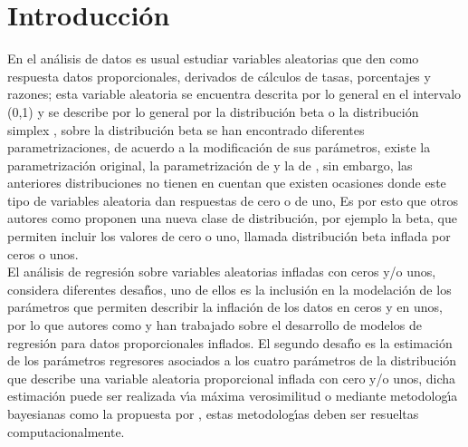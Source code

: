 \chapter{Introducci\'{o}n}


En el an\'{a}lisis de datos es usual estudiar variables aleatorias que den como respuesta datos proporcionales, derivados de c\'{a}lculos de tasas, porcentajes y razones; esta variable aleatoria se encuentra descrita por lo general en el intervalo (0,1) y se describe por lo general por la distribuci\'{o}n beta o la distribuci\'{o}n simplex \citep{Jorgensen1}, sobre la distribuci\'{o}n beta se han encontrado diferentes parametrizaciones, de acuerdo a la modificaci\'{o}n de sus par\'{a}metros, existe la parametrizaci\'{o}n original, la parametrizaci\'{o}n de \cite{Ferrari2} y la de \cite{Stasinopoulos2}, sin embargo, las anteriores distribuciones no tienen en cuentan que existen ocasiones donde este tipo de variables aleatoria dan respuestas de cero o de uno, Es por esto que otros autores como \cite{Ospina2} proponen una nueva clase de distribuci\'{o}n, por ejemplo la beta, que permiten incluir los valores de cero o uno, llamada distribuci\'{o}n beta inflada por ceros o unos.\\

El an\'{a}lisis de regresi\'{o}n sobre variables aleatorias infladas con ceros y/o unos, considera diferentes desaf\'{\i}os, uno de ellos es la inclusi\'{o}n en la modelaci\'{o}n de los par\'{a}metros que permiten describir la inflaci\'{o}n de los datos en ceros y en unos, por lo que autores como \cite{Ospina1} y \cite{Kosmidis1} han trabajado sobre el desarrollo de modelos de regresi\'{o}n para datos proporcionales inflados. El segundo desaf\'{\i}o es la estimaci\'{o}n de los par\'{a}metros regresores asociados a los cuatro par\'{a}metros de la distribuci\'{o}n que describe una variable aleatoria proporcional inflada con cero y/o unos, dicha estimaci\'{o}n puede ser realizada v\'{\i}a m\'{a}xima verosimilitud \citep{Ospina1} o mediante metodolog\'{\i}a bayesianas como la propuesta por \cite{Galvis1}, estas metodolog\'{\i}as deben ser resueltas computacionalmente.\\


